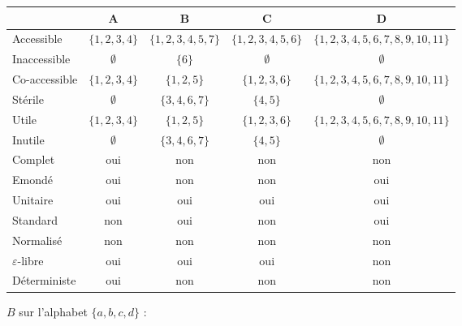 \begin{corrections}

  \begin{questions}
  \item {\small
    \begin{tabular}[t]{| l | c c c c |}
      \hline
      & A & B & C  & D \\
      \hline
      Accessible          & $\{1,2,3,4\}$ & $\{1, 2, 3, 4, 5, 7\}$  & $\{1, 2, 3, 4, 5, 6\}$  & $\{1, 2, 3, 4, 5, 6, 7, 8, 9, 10, 11\}$ \\
      Inaccessible        & $\emptyset$   & $\{6\}$                 & $\emptyset$             & $\emptyset$                             \\
      Co-accessible       & $\{1,2,3,4\}$ & $\{1, 2, 5\}$           & $\{1, 2, 3, 6\}$        & $\{1, 2, 3, 4, 5, 6, 7, 8, 9, 10, 11\}$ \\
      Stérile             & $\emptyset$   & $\{3, 4, 6, 7\}$        & $\{4, 5\}$              & $\emptyset$                             \\
      Utile               & $\{1,2,3,4\}$ & $\{1, 2, 5\}$           & $\{1, 2, 3, 6\}$        & $\{1, 2, 3, 4, 5, 6, 7, 8, 9, 10, 11\}$ \\
      Inutile             & $\emptyset$   & $\{3, 4, 6, 7\}$        & $\{4, 5\}$              & $\emptyset$                             \\
      Complet             & oui           & non                     & non                     & non                                     \\
      Emondé              & oui           & non                     & non                     & oui                                     \\
      Unitaire            & oui           & oui                     & oui                     & oui                                     \\
      Standard            & non           & oui                     & non                     & oui                                     \\
      Normalisé           & non           & non                     & non                     & non                                     \\
      $\varepsilon$-libre & oui           & oui                     & oui                     & non                                     \\
      Déterministe        & oui           & non                     & non                     & non                                     \\
      \hline
  \end{tabular}}
  \item 
    \begin{minipage}[t]{.4\textwidth}
      $B$ sur l'alphabet $\{a,b,c,d\}$ :\\


\end{minipage}
\end{questions}
\end{corrections}
